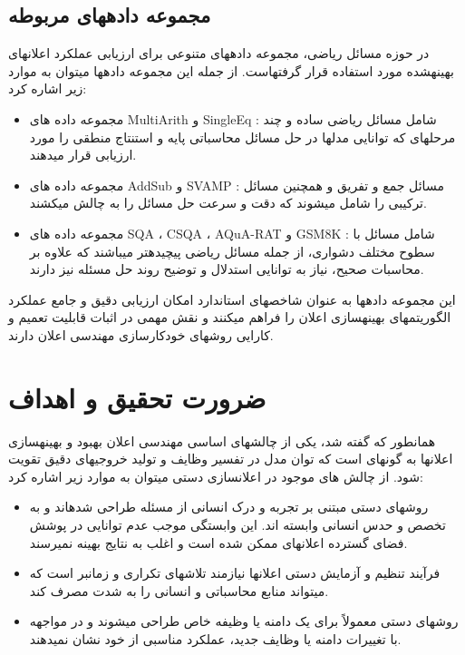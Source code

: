 \subsection{مجموعه داده\/های مربوطه}
در حوزه مسائل ریاضی، \/مجموعه داده\/های متنوعی برای ارزیابی عملکرد اعلان\/های بهینه\/شده مورد استفاده قرار گرفته\/است. از جمله این مجموعه داده\/ها می\/توان به موارد زیر اشاره کرد:
\begin{itemize}
	\item مجموعه داده های
	 MultiArith \cite{MultiArith}
	  و
	 SingleEq \cite{SingleEQ} 
	 :
	شامل مسائل ریاضی ساده و چند مرحله\/ای که توانایی مدل\/ها در حل مسائل محاسباتی پایه و استنتاج منطقی را مورد ارزیابی قرار می\/دهند.
	\item مجموعه داده های
	 AddSub \cite{AddSub}
	 و
	 SVAMP \cite{SVAMP} 
	 :
	مسائل جمع و تفریق و همچنین مسائل ترکیبی را شامل می\/شوند که دقت و سرعت حل مسائل را به چالش می\/کشند.
	\item مجموعه داده های
	 SQA \cite{SQA} 
	 ،
	 CSQA \cite{CSQA} 
	 ، 
	 AQuA-RAT \cite{AquaRat}
	 و
	 GSM8K \cite{GSM8k} 
	 :
	شامل مسائل با سطوح مختلف دشواری، از جمله مسائل ریاضی پیچیده\/تر می\/باشند که علاوه بر محاسبات صحیح، نیاز به توانایی استدلال و توضیح روند حل مسئله نیز دارند.
\end{itemize}

این مجموعه داده\/ها به عنوان شاخص\/های استاندارد امکان ارزیابی دقیق و جامع عملکرد الگوریتم\/های بهینه\/سازی اعلان را فراهم می\/کنند و نقش مهمی در اثبات قابلیت تعمیم و کارایی روش\/های خودکارسازی مهندسی اعلان دارند.

\section{ ضرورت تحقیق و اهداف}\label{import}
همانطور که گفته شد، یکی از چالش\/های اساسی مهندسی اعلان بهبود و بهینه\/سازی اعلان\/ها به گونه\/ای است که توان مدل در تفسیر وظایف و تولید خروجی\/های دقیق تقویت شود. از چالش های موجود در اعلان\/سازی دستی میتوان به موارد زیر اشاره کرد:

\begin{itemize}
	\item روش\/های دستی مبتنی بر تجربه و درک انسانی  از مسئله طراحی شده\/اند و به تخصص و حدس انسانی وابسته \/اند. این وابستگی موجب عدم توانایی در پوشش فضای گسترده اعلان\/های ممکن شده است و اغلب به نتایج بهینه نمی\/رسند.
	\item فرآیند تنظیم و آزمایش دستی اعلان\/ها نیازمند تلاش\/های تکراری و زمان\/بر است که می\/تواند منابع محاسباتی و انسانی را به شدت مصرف کند.
	\item روش\/های دستی معمولاً برای یک دامنه یا وظیفه خاص طراحی می\/شوند و در مواجهه با تغییرات دامنه یا وظایف جدید، عملکرد مناسبی از خود نشان نمی\/دهند.
\end{itemize}

